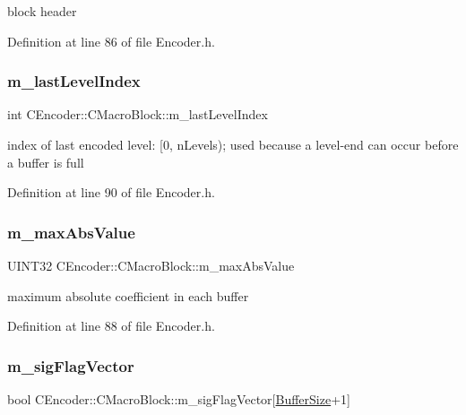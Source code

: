 block header 



Definition at line 86 of file Encoder.\+h.

\mbox{\label{classCEncoder_1_1CMacroBlock_a68163a823248889d9d407f4b0331245d}} 
\subsubsection{\texorpdfstring{m\_lastLevelIndex}{m\_lastLevelIndex}}
{\footnotesize\ttfamily int C\+Encoder\+::\+C\+Macro\+Block\+::m\+\_\+last\+Level\+Index}



index of last encoded level\+: \mbox{[}0, n\+Levels); used because a level-\/end can occur before a buffer is full 



Definition at line 90 of file Encoder.\+h.

\mbox{\label{classCEncoder_1_1CMacroBlock_a865f294ffa568a165224c2105bf1bb01}} 
\subsubsection{\texorpdfstring{m\_maxAbsValue}{m\_maxAbsValue}}
{\footnotesize\ttfamily U\+I\+N\+T32 C\+Encoder\+::\+C\+Macro\+Block\+::m\+\_\+max\+Abs\+Value}



maximum absolute coefficient in each buffer 



Definition at line 88 of file Encoder.\+h.

\mbox{\label{classCEncoder_1_1CMacroBlock_a7acaa42598512b958d5e16b8bcded13b}} 
\subsubsection{\texorpdfstring{m\_sigFlagVector}{m\_sigFlagVector}}
{\footnotesize\ttfamily bool C\+Encoder\+::\+C\+Macro\+Block\+::m\+\_\+sig\+Flag\+Vector\mbox{[}\mbox{\hyperlink{PGFtypes_8h_aa362edf6db9662acf6ef958a6db19c35}{Buffer\+Size}}+1\mbox{]}\hspace{0.3cm}{\ttfamily [private]}}



